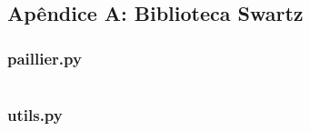 \begin{appendices}

\chapter*{Apêndice A: Biblioteca Swartz}


\subsection*{paillier.py}
\inputminted[linenos,python3,stripnl]{python}{apendices/paillier.py}

\subsection*{utils.py}
\inputminted[linenos,python3,stripnl]{python}{apendices/utils.py}

\end{appendices}
